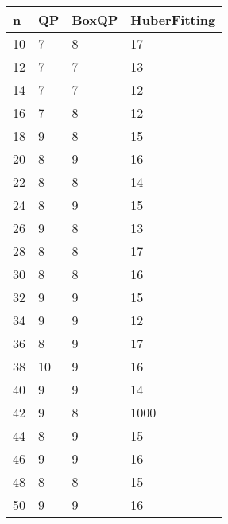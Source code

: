 \begin{tabular}{llll}
n & QP & BoxQP & HuberFitting \\ 
\hline 
10 & 7 & 8 & 17 \\ 
12 & 7 & 7 & 13 \\ 
14 & 7 & 7 & 12 \\ 
16 & 7 & 8 & 12 \\ 
18 & 9 & 8 & 15 \\ 
20 & 8 & 9 & 16 \\ 
22 & 8 & 8 & 14 \\ 
24 & 8 & 9 & 15 \\ 
26 & 9 & 8 & 13 \\ 
28 & 8 & 8 & 17 \\ 
30 & 8 & 8 & 16 \\ 
32 & 9 & 9 & 15 \\ 
34 & 9 & 9 & 12 \\ 
36 & 8 & 9 & 17 \\ 
38 & 10 & 9 & 16 \\ 
40 & 9 & 9 & 14 \\ 
42 & 9 & 8 & 1000 \\ 
44 & 8 & 9 & 15 \\ 
46 & 9 & 9 & 16 \\ 
48 & 8 & 8 & 15 \\ 
50 & 9 & 9 & 16 \\ 
\hline 
\end{tabular}